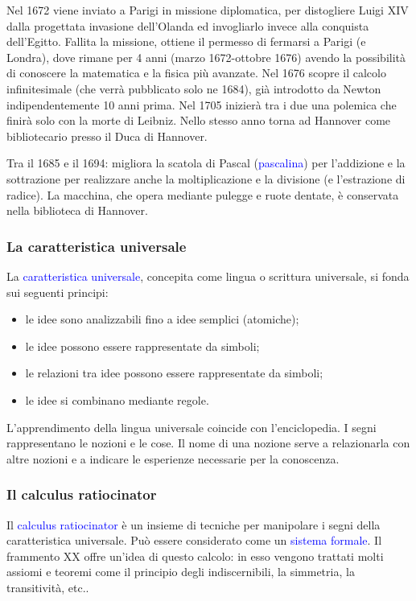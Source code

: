 Nel 1672 viene inviato a Parigi in missione diplomatica, per distogliere Luigi XIV dalla
progettata invasione dell’Olanda ed invogliarlo invece alla conquista dell’Egitto.
Fallita la missione, ottiene il permesso di fermarsi a Parigi (e Londra), dove rimane per 4
anni (marzo 1672-ottobre 1676) avendo la possibilità di conoscere la matematica e la
fisica più avanzate. Nel 1676 scopre il calcolo infinitesimale (che verrà pubblicato solo ne 1684), già
introdotto da Newton indipendentemente 10 anni prima. Nel 1705 inizierà tra i due una
polemica che finirà solo con la morte di Leibniz.
Nello stesso anno torna ad Hannover come bibliotecario presso il Duca di Hannover.

Tra il 1685 e il 1694: migliora la scatola di Pascal (\textcolor{blue}{pascalina}) per l’addizione e la sottrazione per realizzare
anche la moltiplicazione e la divisione (e l’estrazione di radice). La macchina, che opera
mediante pulegge e ruote dentate, è conservata nella biblioteca di Hannover.

\subsubsection{La caratteristica universale}

La \textcolor{blue}{caratteristica universale}, concepita come lingua o scrittura universale, si fonda sui seguenti principi:

\begin{itemize}
    \item le idee sono analizzabili fino a idee semplici (atomiche);
    \item le idee possono essere rappresentate da simboli;
    \item le relazioni tra idee possono essere rappresentate da simboli;
    \item le idee si combinano mediante regole.
\end{itemize}

L'apprendimento della lingua universale coincide con l'enciclopedia. I segni rappresentano le nozioni e le cose. Il nome di una
nozione serve a relazionarla con altre nozioni e a indicare le esperienze necessarie per la conoscenza.

\subsubsection{Il calculus ratiocinator}

Il \textcolor{blue}{calculus ratiocinator} è un insieme di tecniche per manipolare i segni della caratteristica universale. Può essere considerato come un \textcolor{blue}{sistema formale}. Il frammento XX offre un'idea di questo calcolo: in esso vengono trattati molti assiomi e teoremi come il principio degli indiscernibili, la simmetria, la transitività, etc..


